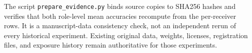 \documentclass[11pt]{article}
\begin{document}
The script \texttt{prepare\_evidence.py} binds source copies to SHA256 hashes and verifies that both role-level mean accuracies recompute from the per-receiver rows. It is a manuscript-data consistency check, not an independent rerun of every historical experiment. Existing original data, weights, licenses, registration files, and exposure history remain authoritative for those experiments.
\end{document}
